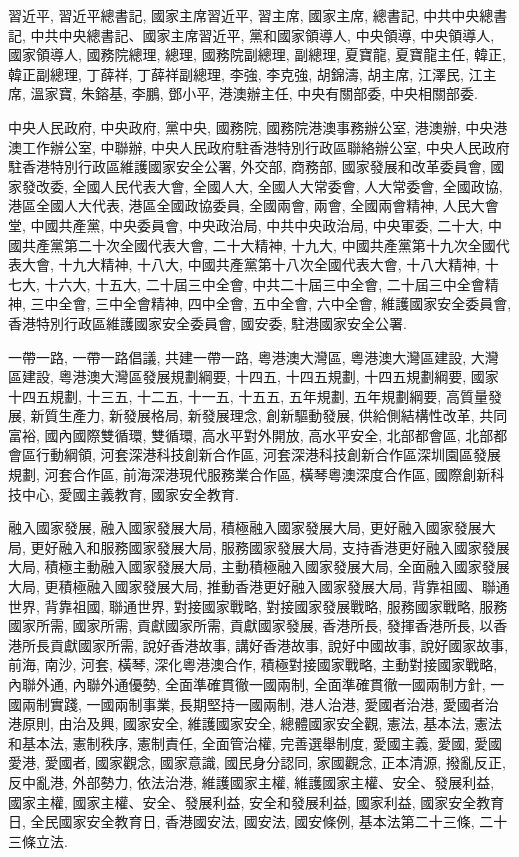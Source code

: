 \documentclass[9pt,a4paper,twocolumn,twoside]{rho-class/rho}
\begin{document}
    \begin{description}
        \setlength{\itemsep}{6pt}
        \item[1. Personal Loyalty:] 習近平, 習近平總書記, 國家主席習近平, 習主席, 國家主席, 總書記, 中共中央總書記, 中共中央總書記、國家主席習近平, 黨和國家領導人, 中央領導, 中央領導人, 國家領導人, 國務院總理, 總理, 國務院副總理, 副總理, 夏寶龍, 夏寶龍主任, 韓正, 韓正副總理, 丁薛祥, 丁薛祥副總理, 李強, 李克強, 胡錦濤, 胡主席, 江澤民, 江主席, 溫家寶, 朱鎔基, 李鵬, 鄧小平, 港澳辦主任, 中央有關部委, 中央相關部委.
        \item[2. Institutional Loyalty:] 中央人民政府, 中央政府, 黨中央, 國務院, 國務院港澳事務辦公室, 港澳辦, 中央港澳工作辦公室, 中聯辦, 中央人民政府駐香港特別行政區聯絡辦公室, 中央人民政府駐香港特別行政區維護國家安全公署, 外交部, 商務部, 國家發展和改革委員會, 國家發改委, 全國人民代表大會, 全國人大, 全國人大常委會, 人大常委會, 全國政協, 港區全國人大代表, 港區全國政協委員, 全國兩會, 兩會, 全國兩會精神, 人民大會堂, 中國共產黨, 中央委員會, 中央政治局, 中共中央政治局, 中央軍委, 二十大, 中國共產黨第二十次全國代表大會, 二十大精神, 十九大, 中國共產黨第十九次全國代表大會, 十九大精神, 十八大, 中國共產黨第十八次全國代表大會, 十八大精神, 十七大, 十六大, 十五大, 二十屆三中全會, 中共二十屆三中全會, 二十屆三中全會精神, 三中全會, 三中全會精神, 四中全會, 五中全會, 六中全會, 維護國家安全委員會, 香港特別行政區維護國家安全委員會, 國安委, 駐港國家安全公署.
        \item[3. Policy Loyalty:] 一帶一路, 一帶一路倡議, 共建一帶一路, 粵港澳大灣區, 粵港澳大灣區建設, 大灣區建設, 粵港澳大灣區發展規劃綱要, 十四五, 十四五規劃, 十四五規劃綱要, 國家十四五規劃, 十三五, 十二五, 十一五, 十五五, 五年規劃, 五年規劃綱要, 高質量發展, 新質生產力, 新發展格局, 新發展理念, 創新驅動發展, 供給側結構性改革, 共同富裕, 國內國際雙循環, 雙循環, 高水平對外開放, 高水平安全, 北部都會區, 北部都會區行動綱領, 河套深港科技創新合作區, 河套深港科技創新合作區深圳園區發展規劃, 河套合作區, 前海深港現代服務業合作區, 橫琴粵澳深度合作區, 國際創新科技中心, 愛國主義教育, 國家安全教育.
        \item[4. Nationalistic Loyalty:] 融入國家發展, 融入國家發展大局, 積極融入國家發展大局, 更好融入國家發展大局, 更好融入和服務國家發展大局, 服務國家發展大局, 支持香港更好融入國家發展大局, 積極主動融入國家發展大局, 主動積極融入國家發展大局, 全面融入國家發展大局, 更積極融入國家發展大局, 推動香港更好融入國家發展大局, 背靠祖國、聯通世界, 背靠祖國, 聯通世界, 對接國家戰略, 對接國家發展戰略, 服務國家戰略, 服務國家所需, 國家所需, 貢獻國家所需, 貢獻國家發展, 香港所長, 發揮香港所長, 以香港所長貢獻國家所需, 說好香港故事, 講好香港故事, 說好中國故事, 說好國家故事, 前海, 南沙, 河套, 橫琴, 深化粵港澳合作, 積極對接國家戰略, 主動對接國家戰略, 內聯外通, 內聯外通優勢, 全面準確貫徹一國兩制, 全面準確貫徹一國兩制方針, 一國兩制實踐, 一國兩制事業, 長期堅持一國兩制, 港人治港, 愛國者治港, 愛國者治港原則, 由治及興, 國家安全, 維護國家安全, 總體國家安全觀, 憲法, 基本法, 憲法和基本法, 憲制秩序, 憲制責任, 全面管治權, 完善選舉制度, 愛國主義, 愛國, 愛國愛港, 愛國者, 國家觀念, 國家意識, 國民身分認同, 家國觀念, 正本清源, 撥亂反正, 反中亂港, 外部勢力, 依法治港, 維護國家主權, 維護國家主權、安全、發展利益, 國家主權, 國家主權、安全、發展利益, 安全和發展利益, 國家利益, 國家安全教育日, 全民國家安全教育日, 香港國安法, 國安法, 國安條例, 基本法第二十三條, 二十三條立法.

\end{description}
\end{document}
